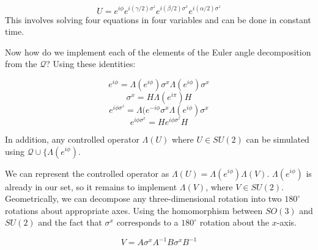 \begin{equation*}
U = e^{i\phi}e^{i(\gamma/2)\sigma^z}e^{i(\beta/2)\sigma^x}e^{i(\alpha/2)\sigma^z}
\end{equation*}
This involves solving four equations in four variables and can be done in
constant time.

Now how do we implement each of the elements of the Euler angle decomposition from
the $\mathcal{Q}$? Using these identities:

\begin{equation*}
e^{i\phi} = \Lambda(e^{i\phi})\sigma^x\Lambda(e^{i\phi})\sigma^x
\end{equation*}
\begin{equation*}
\sigma^x = H\Lambda(e^{i\pi})H
\end{equation*}
\begin{equation*}
e^{i\phi\sigma^z} = \Lambda(e^{-i\phi}\sigma^x\Lambda(e^{i\phi})\sigma^x
\end{equation*}
\begin{equation*}
e^{i\phi\sigma^x} = H e^{i\phi\sigma^z} H
\end{equation*}

In addition,
any controlled operator $\Lambda(U)$ where $U \in SU(2)$ can be simulated
using
$\mathcal{Q} \cup \{ \Lambda(e^{i\phi})$.

We can represent the controlled operator as $\Lambda(U) = \Lambda(e^{i\phi})\Lambda(V)$.
$\Lambda(e^{i\phi})$ is already in our set, so it remains to implement
$\Lambda(V)$, where $V \in SU(2)$. Geometrically, we can decompose any
three-dimensional rotation into two $180^{\circ}$ rotations about appropriate
axes. Using the homomorphism between $SO(3)$ and $SU(2)$ and the fact that
$\sigma^x$ corresponds to a $180^{\circ}$ rotation about the $x$-axis.

\begin{equation*}
V = A\sigma^x A^{-1} B\sigma^x B^{-1}
\end{equation*}
